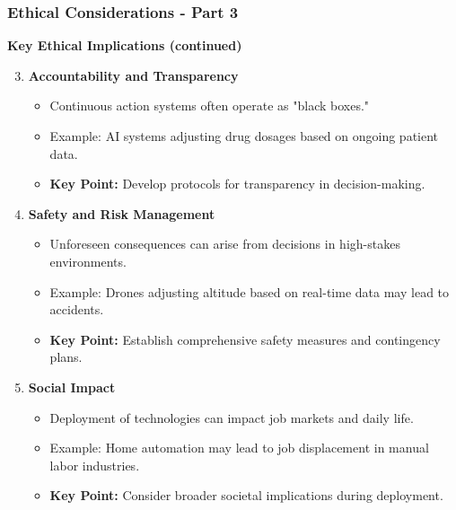 \documentclass[aspectratio=169]{beamer}
\begin{document}
\begin{frame}[fragile]
    \frametitle{Ethical Considerations - Part 3}
    \textbf{Key Ethical Implications (continued)}
    
    \begin{enumerate}
        \setcounter{enumi}{2} %
        \item \textbf{Accountability and Transparency}
        \begin{itemize}
            \item Continuous action systems often operate as "black boxes."
            \item Example: AI systems adjusting drug dosages based on ongoing patient data.
            \item \textbf{Key Point:} Develop protocols for transparency in decision-making.
        \end{itemize}

        \item \textbf{Safety and Risk Management}
        \begin{itemize}
            \item Unforeseen consequences can arise from decisions in high-stakes environments.
            \item Example: Drones adjusting altitude based on real-time data may lead to accidents.
            \item \textbf{Key Point:} Establish comprehensive safety measures and contingency plans.
        \end{itemize}

        \item \textbf{Social Impact}
        \begin{itemize}
            \item Deployment of technologies can impact job markets and daily life.
            \item Example: Home automation may lead to job displacement in manual labor industries.
            \item \textbf{Key Point:} Consider broader societal implications during deployment.
        \end{itemize}
    \end{enumerate}
\end{frame}
\end{document}
